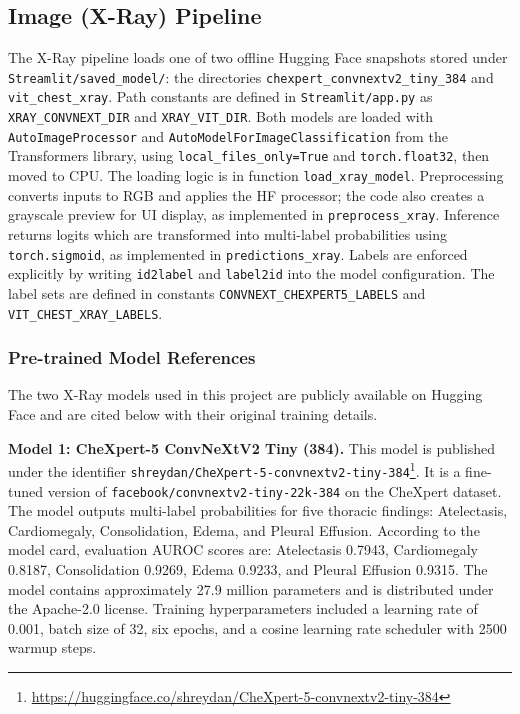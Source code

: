 \documentclass[11pt,a4paper]{article}
\begin{document}
\subsection{Image (X-Ray) Pipeline}
The X-Ray pipeline loads one of two offline Hugging Face snapshots stored under \texttt{Streamlit/saved\_model/}: the directories \texttt{chexpert\_convnextv2\_tiny\_384} and \texttt{vit\_chest\_xray}. Path constants are defined in \texttt{Streamlit/app.py} as \texttt{XRAY\_CONVNEXT\_DIR} and \texttt{XRAY\_VIT\_DIR}. Both models are loaded with \texttt{AutoImageProcessor} and \texttt{AutoModelForImageClassification} from the Transformers library, using \texttt{local\_files\_only=True} and \texttt{torch.float32}, then moved to CPU. The loading logic is in function \texttt{load\_xray\_model}. Preprocessing converts inputs to RGB and applies the HF processor; the code also creates a grayscale preview for UI display, as implemented in \texttt{preprocess\_xray}. Inference returns logits which are transformed into multi-label probabilities using \texttt{torch.sigmoid}, as implemented in \texttt{predictions\_xray}. Labels are enforced explicitly by writing \texttt{id2label} and \texttt{label2id} into the model configuration. The label sets are defined in constants \texttt{CONVNEXT\_CHEXPERT5\_LABELS} and \texttt{VIT\_CHEST\_XRAY\_LABELS}.

\subsubsection{Pre-trained Model References}

The two X-Ray models used in this project are publicly available on Hugging Face and are cited below with their original training details.

\textbf{Model 1: CheXpert-5 ConvNeXtV2 Tiny (384).}
This model is published under the identifier \texttt{shreydan/CheXpert-5-convnextv2-tiny-384}\footnote{\url{https://huggingface.co/shreydan/CheXpert-5-convnextv2-tiny-384}}. It is a fine-tuned version of \texttt{facebook/convnextv2-tiny-22k-384} on the CheXpert dataset. The model outputs multi-label probabilities for five thoracic findings: Atelectasis, Cardiomegaly, Consolidation, Edema, and Pleural Effusion. According to the model card, evaluation AUROC scores are: Atelectasis 0.7943, Cardiomegaly 0.8187, Consolidation 0.9269, Edema 0.9233, and Pleural Effusion 0.9315. The model contains approximately 27.9 million parameters and is distributed under the Apache-2.0 license. Training hyperparameters included a learning rate of 0.001, batch size of 32, six epochs, and a cosine learning rate scheduler with 2500 warmup steps.
\end{document}
